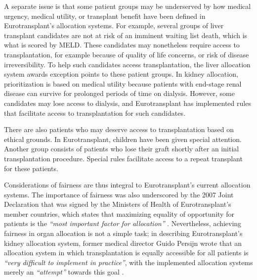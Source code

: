 \documentclass[11pt,twoside,]{book}
\begin{document}
A separate issue is that some patient groups may be underserved by how medical
urgency, medical utility, or transplant benefit have been defined in
Eurotransplant's allocation systems. For example, several groups of liver
transplant candidates are not at risk of an imminent waiting list death,
which is what is scored by MELD. These candidates may nonetheless require access to
transplantation, for example because of quality of life concerns,
or risk of disease irreversibility.
To help such candidates access transplantation, the liver allocation system awards exception
points to these patient groups. In kidney allocation, prioritization is based on
medical utility because patients with end-stage renal disease can survive for
prolonged periods of time on dialysis. However, some candidates may
lose access to dialysis, and Eurotransplant has implemented rules that facilitate
access to transplantation for such candidates.

There are also patients who may deserve access to transplantation based on
ethical grounds. In Eurotransplant, children have been given special attention.
Another group consists of patients who lose their graft shortly after
an initial transplantation procedure. Special rules
facilitate access to a repeat transplant for these patients.

Considerations of fairness are thus integral to Eurotransplant's current
allocation systems. The importance of fairness was also underscored by the
2007 Joint Declaration that was signed by the Ministers of Health of
Eurotransplant's member countries, which states that maximizing equality of
opportunity for patients is the \emph{``most important factor for allocation''} \citep{ETMan2025}.
Nevertheless, achieving fairness in organ allocation is not a simple task; in describing
Eurotransplant's kidney allocation system, former medical director Guido Persijn
wrote that an allocation system in which transplantation is equally accessible
for all patients is \emph{``very difficult to implement in practice''}, with the
implemented allocation systems merely an \emph{``attempt''} towards this goal \citep{Persijn2006}.
\end{document}
